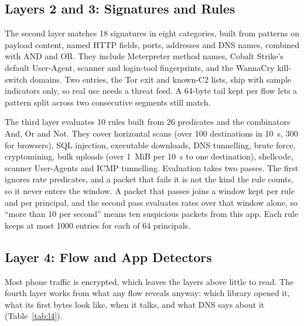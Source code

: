 \documentclass[runningheads]{llncs}
\begin{document}
\subsection{Layers 2 and 3: Signatures and Rules}

The second layer matches 18 signatures in eight categories, built from patterns on payload content, named HTTP fields, ports, addresses and DNS names, combined with AND and OR. They include Meterpreter method names, Cobalt Strike's default User-Agent, scanner and login-tool fingerprints, and the WannaCry kill-switch domains. Two entries, the Tor exit and known-C2 lists, ship with sample indicators only, so real use needs a threat feed. A 64-byte tail kept per flow lets a pattern split across two consecutive segments still match.

The third layer evaluates 10 rules built from 26 predicates and the combinators And, Or and Not. They cover horizontal scans (over 100 destinations in 10~s, 300 for browsers), SQL injection, executable downloads, DNS tunnelling, brute force, cryptomining, bulk uploads (over 1~MiB per 10~s to one destination), shellcode, scanner User-Agents and ICMP tunnelling. Evaluation takes two passes. The first ignores rate predicates, and a packet that fails it is not the kind the rule counts, so it never enters the window. A packet that passes joins a window kept per rule and per principal, and the second pass evaluates rates over that window alone, so ``more than 10 per second'' means ten suspicious packets from this app. Each rule keeps at most 1000 entries for each of 64 principals.

\subsection{Layer 4: Flow and App Detectors}\label{sec:layer4}

Most phone traffic is encrypted, which leaves the layers above little to read. The fourth layer works from what any flow reveals anyway: which library opened it, what its first bytes look like, when it talks, and what DNS says about it (Table~\ref{tab:l4}).
\end{document}
